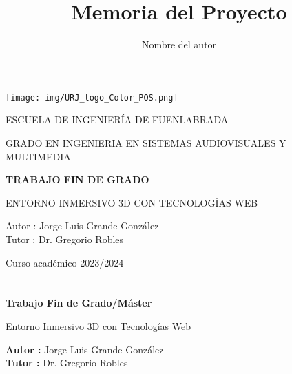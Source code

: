 \documentclass[a4paper, 12pt]{book}
\title{Memoria del Proyecto}
\author{Nombre del autor}
\begin{document}
\renewcommand{\refname}{Bibliografía}  %
\renewcommand{\appendixname}{Apéndice}



\begin{titlepage}
\begin{center}
\texttt{[image: img/URJ\_logo\_Color\_POS.png]}

\vspace{1.75cm}

\LARGE
ESCUELA DE INGENIERÍA DE FUENLABRADA
\vspace{1cm}

\LARGE
GRADO EN INGENIERIA EN SISTEMAS AUDIOVISUALES Y MULTIMEDIA

\vspace{1cm}
\LARGE
\textbf{TRABAJO FIN DE GRADO}

\vspace{2cm}

\Large
ENTORNO INMERSIVO 3D CON TECNOLOGÍAS WEB

\vspace{2cm}

\large
Autor : Jorge Luis Grande González \\
Tutor : Dr. Gregorio Robles\\
\vspace{1cm}

\large
Curso académico 2023/2024

\end{center}
\end{titlepage}

\newpage
\mbox{}
\thispagestyle{empty} %



\clearpage
{}
\chapter*{}

\vspace{-4cm}
\begin{center}
\LARGE
\textbf{Trabajo Fin de Grado/Máster}

\vspace{1cm}
\large
Entorno Inmersivo 3D con Tecnologías Web

\vspace{1cm}
\large
\textbf{Autor :} Jorge Luis Grande González \\
\textbf{Tutor :} Dr. Gregorio Robles

\end{center}
\end{document}
